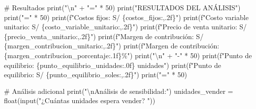 \documentclass[
  doc,
  floatsintext,
  longtable,
  a4paper,
  nolmodern,
  notxfonts,
  notimes,
  12pt,
  colorlinks=true,linkcolor=blue,citecolor=blue,urlcolor=blue]{apa7}
\newenvironment{Shaded}{\begin{snugshade}}{\end{snugshade}}
\newcommand{\BuiltInTok}[1]{\textcolor[rgb]{0.00,0.23,0.31}{#1}}
\newcommand{\CharTok}[1]{\textcolor[rgb]{0.13,0.47,0.30}{#1}}
\newcommand{\CommentTok}[1]{\textcolor[rgb]{0.37,0.37,0.37}{#1}}
\newcommand{\DecValTok}[1]{\textcolor[rgb]{0.68,0.00,0.00}{#1}}
\newcommand{\NormalTok}[1]{\textcolor[rgb]{0.00,0.23,0.31}{#1}}
\newcommand{\OperatorTok}[1]{\textcolor[rgb]{0.37,0.37,0.37}{#1}}
\newcommand{\SpecialCharTok}[1]{\textcolor[rgb]{0.37,0.37,0.37}{#1}}
\newcommand{\SpecialStringTok}[1]{\textcolor[rgb]{0.13,0.47,0.30}{#1}}
\newcommand{\StringTok}[1]{\textcolor[rgb]{0.13,0.47,0.30}{#1}}
\begin{document}
\begin{Shaded}
\begin{Highlighting}[]
    \CommentTok{\# Resultados}
    \BuiltInTok{print}\NormalTok{(}\StringTok{"}\CharTok{\textbackslash{}n}\StringTok{"} \OperatorTok{+} \StringTok{"="} \OperatorTok{*} \DecValTok{50}\NormalTok{)}
    \BuiltInTok{print}\NormalTok{(}\StringTok{"RESULTADOS DEL ANÁLISIS"}\NormalTok{)}
    \BuiltInTok{print}\NormalTok{(}\StringTok{"="} \OperatorTok{*} \DecValTok{50}\NormalTok{)}
    \BuiltInTok{print}\NormalTok{(}\SpecialStringTok{f"Costos fijos:                 S/ }\SpecialCharTok{\{}\NormalTok{costos\_fijos}\SpecialCharTok{:,.2f\}}\SpecialStringTok{"}\NormalTok{)}
    \BuiltInTok{print}\NormalTok{(}\SpecialStringTok{f"Costo variable unitario:      S/ }\SpecialCharTok{\{}\NormalTok{costo\_variable\_unitario}\SpecialCharTok{:,.2f\}}\SpecialStringTok{"}\NormalTok{)}
    \BuiltInTok{print}\NormalTok{(}\SpecialStringTok{f"Precio de venta unitario:     S/ }\SpecialCharTok{\{}\NormalTok{precio\_venta\_unitario}\SpecialCharTok{:,.2f\}}\SpecialStringTok{"}\NormalTok{)}
    \BuiltInTok{print}\NormalTok{(}\SpecialStringTok{f"Margen de contribución:       S/ }\SpecialCharTok{\{}\NormalTok{margen\_contribucion\_unitario}\SpecialCharTok{:,.2f\}}\SpecialStringTok{"}\NormalTok{)}
    \BuiltInTok{print}\NormalTok{(}\SpecialStringTok{f"Margen de contribución:       }\SpecialCharTok{\{}\NormalTok{margen\_contribucion\_porcentaje}\SpecialCharTok{:.1f\}}\SpecialStringTok{\%"}\NormalTok{)}
    \BuiltInTok{print}\NormalTok{(}\StringTok{"}\CharTok{\textbackslash{}n}\StringTok{"} \OperatorTok{+} \StringTok{"{-}"} \OperatorTok{*} \DecValTok{50}\NormalTok{)}
    \BuiltInTok{print}\NormalTok{(}\SpecialStringTok{f"Punto de equilibrio:          }\SpecialCharTok{\{}\NormalTok{punto\_equilibrio\_unidades}\SpecialCharTok{:.0f\}}\SpecialStringTok{ unidades"}\NormalTok{)}
    \BuiltInTok{print}\NormalTok{(}\SpecialStringTok{f"Punto de equilibrio:          S/ }\SpecialCharTok{\{}\NormalTok{punto\_equilibrio\_soles}\SpecialCharTok{:,.2f\}}\SpecialStringTok{"}\NormalTok{)}
    \BuiltInTok{print}\NormalTok{(}\StringTok{"="} \OperatorTok{*} \DecValTok{50}\NormalTok{)}

    \CommentTok{\# Análisis adicional}
    \BuiltInTok{print}\NormalTok{(}\StringTok{"}\CharTok{\textbackslash{}n}\StringTok{Análisis de sensibilidad:"}\NormalTok{)}
\NormalTok{    unidades\_vender }\OperatorTok{=} \BuiltInTok{float}\NormalTok{(}\BuiltInTok{input}\NormalTok{(}\StringTok{"¿Cuántas unidades espera vender? "}\NormalTok{))}


\end{Highlighting}
\end{Shaded}
\end{document}
